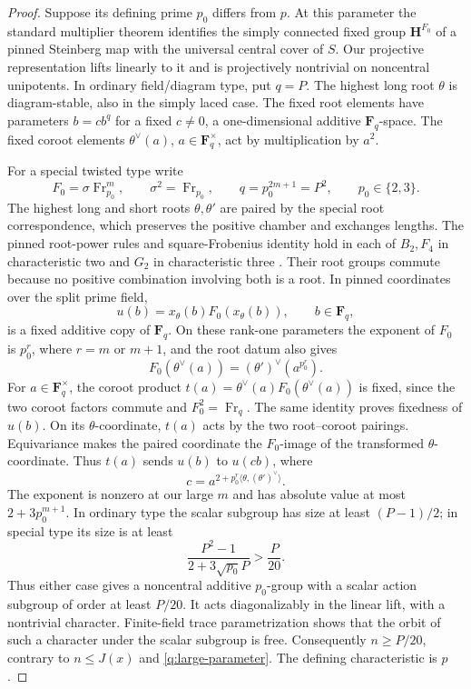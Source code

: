 \begin{proof}
Suppose its defining prime $p_0$ differs from $p$.  At this parameter the
standard multiplier theorem identifies the simply connected fixed group
$\mathbf H^{F_0}$ of a pinned Steinberg map with the universal central
cover of $S$.  Our projective representation lifts linearly to it and is
projectively nontrivial on noncentral unipotents.  In ordinary
field/diagram type, put $q=P$.  The highest long root $\theta$ is
diagram-stable, also in the simply laced case.  The fixed root elements
have parameters $b=cb^q$ for a fixed $c\ne0$, a one-dimensional additive
$\mathbf F_q$-space.  The fixed coroot elements $\theta^\vee(a)$,
$a\in\mathbf F_q^\times$, act by multiplication by $a^2$.

For a special twisted type write
\[
 F_0=\sigma\operatorname{Fr}_{p_0}^{m},\qquad
 \sigma^2=\operatorname{Fr}_{p_0},\qquad
 q=p_0^{2m+1}=P^2,\qquad p_0\in\{2,3\}.
\]
The highest long and short roots $\theta,\theta'$ are paired by the
special root correspondence, which preserves the positive chamber and
exchanges lengths.  The pinned root-power rules and square-Frobenius
identity hold in each of $B_2,F_4$ in characteristic two and $G_2$ in
characteristic three \citep[Sections~2--3 and Definition~5.4]{DeMedtsNaert2019}.  Their root groups commute because no positive
combination involving both is a root.  In pinned coordinates over the
split prime field,
\[
                 u(b)=x_\theta(b)F_0(x_\theta(b)),
                 \qquad b\in\mathbf F_q,
\]
is a fixed additive copy of $\mathbf F_q$.  On these rank-one parameters
the exponent of $F_0$ is $p_0^r$, where $r=m$ or $m+1$, and the root datum
also gives
\[
 F_0(\theta^\vee(a))=(\theta')^\vee(a^{p_0^r}).
\]
For $a\in\mathbf F_q^\times$, the coroot product
$t(a)=\theta^\vee(a)F_0(\theta^\vee(a))$ is fixed, since the two
coroot factors commute and $F_0^2=\operatorname{Fr}_q$.
The same identity proves fixedness of $u(b)$.  On its $\theta$-coordinate,
$t(a)$ acts by the two root--coroot pairings.  Equivariance makes the
paired coordinate the $F_0$-image of the transformed $\theta$-coordinate.
Thus $t(a)$ sends $u(b)$ to $u(cb)$, where
\[
                   c=a^{2+p_0^r\langle\theta,(\theta')^\vee\rangle}.
\]
The exponent is nonzero at our large $m$ and has absolute value at most
$2+3p_0^{m+1}$.  In ordinary type the scalar subgroup has size at least
$(P-1)/2$; in special type its size is at least
\[
 \frac{P^2-1}{2+3\sqrt{p_0}P}>\frac P{20}.
\]
Thus either case gives a noncentral additive $p_0$-group with a scalar
action subgroup of order at least $P/20$.  It acts diagonalizably in the
linear lift, with a nontrivial character.  Finite-field trace
parametrization shows that the orbit of such a character under the scalar
subgroup is free.  Consequently $n\ge P/20$, contrary to $n\le J(x)$
and \eqref{q:large-parameter}.  The defining characteristic is $p$.


\end{proof}
